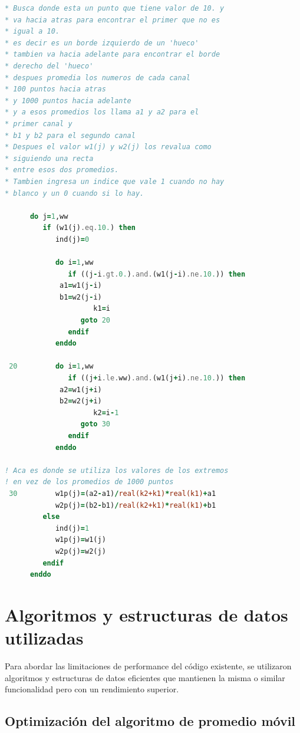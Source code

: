 \documentclass[12pt,a4paper]{article}
\begin{document}
\begin{lstlisting}[language=Fortran, label=lst:codigo_error]
* Busca donde esta un punto que tiene valor de 10. y 
* va hacia atras para encontrar el primer que no es
* igual a 10.
* es decir es un borde izquierdo de un 'hueco'
* tambien va hacia adelante para encontrar el borde
* derecho del 'hueco'
* despues promedia los numeros de cada canal
* 100 puntos hacia atras
* y 1000 puntos hacia adelante 
* y a esos promedios los llama a1 y a2 para el 
* primer canal y
* b1 y b2 para el segundo canal
* Despues el valor w1(j) y w2(j) los revalua como
* siguiendo una recta 
* entre esos dos promedios.
* Tambien ingresa un indice que vale 1 cuando no hay
* blanco y un 0 cuando si lo hay.

      do j=1,ww
         if (w1(j).eq.10.) then
            ind(j)=0
            
            do i=1,ww
               if ((j-i.gt.0.).and.(w1(j-i).ne.10.)) then
		     a1=w1(j-i)
		     b1=w2(j-i)                  
                     k1=i
                  goto 20
               endif
            enddo
            
 20         do i=1,ww  
               if ((j+i.le.ww).and.(w1(j+i).ne.10.)) then
		     a2=w1(j+i)
		     b2=w2(j+i)                  
                     k2=i-1
                  goto 30
               endif
            enddo

! Aca es donde se utiliza los valores de los extremos
! en vez de los promedios de 1000 puntos
 30         w1p(j)=(a2-a1)/real(k2+k1)*real(k1)+a1
            w2p(j)=(b2-b1)/real(k2+k1)*real(k1)+b1
         else
            ind(j)=1
            w1p(j)=w1(j)
            w2p(j)=w2(j)
         endif
      enddo
\end{lstlisting}

\section{Algoritmos y estructuras de datos utilizadas}
\lhead{}

Para abordar las limitaciones de performance del código existente, se utilizaron algoritmos y estructuras de datos eficientes que mantienen la misma o similar funcionalidad pero con un rendimiento superior.

\subsection{Optimización del algoritmo de promedio móvil}
\end{document}
